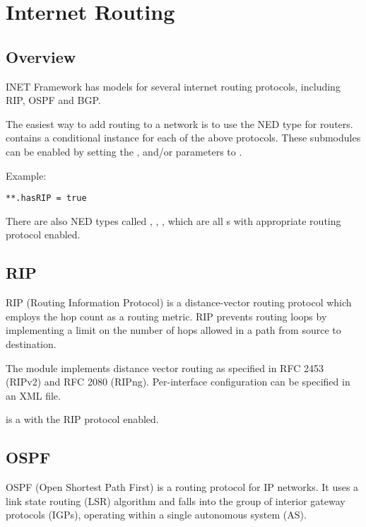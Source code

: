 \chapter{Internet Routing}
\label{cha:routing}

\section{Overview}

INET Framework has models for several internet routing protocols, including
RIP, OSPF and BGP. 

The easiest way to add routing to a network is to use the  
NED type for routers.  contains a conditional instance
for each of the above protocols. These submodules can be enabled by
setting the ,  and/or  parameters to
.

Example:

\begin{verbatim}
**.hasRIP = true
\end{verbatim}

There are also NED types called , ,
, which are all s with appropriate
routing protocol enabled.

\section{RIP}
\label{sec:rip}

RIP (Routing Information Protocol) is a distance-vector routing protocol
which employs the hop count as a routing metric. RIP prevents routing loops
by implementing a limit on the number of hops allowed in a path from source 
to destination.

The  module implements distance vector routing as
specified in RFC 2453 (RIPv2) and RFC 2080 (RIPng). Per-interface
configuration can be specified in an XML file.

 is a  with the RIP protocol enabled.


\section{OSPF}
\label{sec:ospf}

OSPF (Open Shortest Path First) is a routing protocol for IP networks. 
It uses a link state routing (LSR) algorithm and falls into the group 
of interior gateway protocols (IGPs), operating within a single 
autonomous system (AS).

